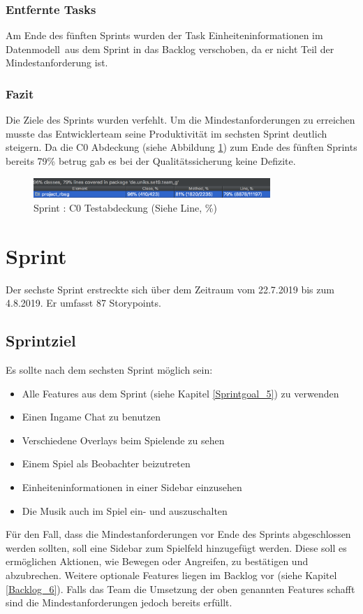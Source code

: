 \documentclass[12pt, titlepage]{scrartcl}
\newcommand{\RN}[1]{%
	\textup{\uppercase\expandafter{\romannumeral#1}}%
}
\begin{document}
        	\subsubsection{Entfernte Tasks}
        		Am Ende des f\"unften Sprints wurden der Task \glqq Einheiteninformationen im Datenmodell\grqq\ aus dem Sprint in das Backlog verschoben, da er nicht Teil der Mindestanforderung ist.
        	\subsubsection{Fazit}
        		Die Ziele des Sprints wurden verfehlt. Um die Mindestanforderungen zu erreichen musste das Entwicklerteam seine Produktivit\"at im sechsten Sprint deutlich steigern. Da die C0 Abdeckung (siehe Abbildung \ref{Coverage_5}) zum Ende des f\"unften Sprints bereits 79\% betrug gab es bei der Qualit\"atssicherung keine Defizite.
        		\begin{figure}[H] 
        			\centering
        			\includegraphics[width=0.8\textwidth]{images/sprintV/coverage.png}
        			\caption{Sprint \RN{5}: C0 Testabdeckung (Siehe Line, \%)}
        			\label{Coverage_5}
        		\end{figure} 
    \newpage
    \section{Sprint \RN{6}}
    	Der sechste Sprint erstreckte sich \"uber dem Zeitraum vom 22.7.2019 bis zum 4.8.2019. Er umfasst 87 Storypoints.
    	\subsection{Sprintziel}
    		Es sollte nach dem sechsten Sprint m\"oglich sein:
    		\begin{itemize}
    			\item Alle Features aus dem Sprint \RN{5} (siehe Kapitel \ref{Sprintgoal_5}) zu verwenden
    			\item Einen Ingame Chat zu benutzen
    			\item Verschiedene Overlays beim Spielende zu sehen
    			\item Einem Spiel als Beobachter beizutreten
    			\item Einheiteninformationen in einer Sidebar einzusehen
    			\item Die Musik auch im Spiel ein- und auszuschalten
    		\end{itemize}
    		F\"ur den Fall, dass die Mindestanforderungen vor Ende des Sprints abgeschlossen werden sollten, soll eine Sidebar zum Spielfeld hinzugef\"ugt werden. Diese soll es erm\"oglichen Aktionen, wie Bewegen oder Angreifen, zu best\"atigen und abzubrechen. Weitere optionale Features liegen im Backlog vor (siehe Kapitel \ref{Backlog_6}). Falls das Team die Umsetzung der oben genannten Features schafft sind die Mindestanforderungen jedoch bereits erf\"ullt.
\end{document}
